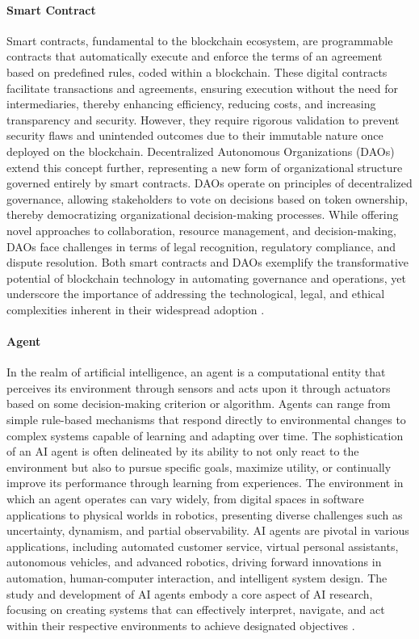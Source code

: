 \documentclass{article}
\begin{document}
\paragraph{Smart Contract}
Smart contracts, fundamental to the blockchain ecosystem, are programmable contracts that automatically execute and enforce the terms of an agreement based on predefined rules, coded within a blockchain. These digital contracts facilitate transactions and agreements, ensuring execution without the need for intermediaries, thereby enhancing efficiency, reducing costs, and increasing transparency and security. However, they require rigorous validation to prevent security flaws and unintended outcomes due to their immutable nature once deployed on the blockchain. Decentralized Autonomous Organizations (DAOs) extend this concept further, representing a new form of organizational structure governed entirely by smart contracts. DAOs operate on principles of decentralized governance, allowing stakeholders to vote on decisions based on token ownership, thereby democratizing organizational decision-making processes. While offering novel approaches to collaboration, resource management, and decision-making, DAOs face challenges in terms of legal recognition, regulatory compliance, and dispute resolution. Both smart contracts and DAOs exemplify the transformative potential of blockchain technology in automating governance and operations, yet underscore the importance of addressing the technological, legal, and ethical complexities inherent in their widespread adoption \cite{Szabo1997, Buterin2014DAO}.

\paragraph{Agent}
In the realm of artificial intelligence, an agent is a computational entity that perceives its environment through sensors and acts upon it through actuators based on some decision-making criterion or algorithm. Agents can range from simple rule-based mechanisms that respond directly to environmental changes to complex systems capable of learning and adapting over time. The sophistication of an AI agent is often delineated by its ability to not only react to the environment but also to pursue specific goals, maximize utility, or continually improve its performance through learning from experiences. The environment in which an agent operates can vary widely, from digital spaces in software applications to physical worlds in robotics, presenting diverse challenges such as uncertainty, dynamism, and partial observability. AI agents are pivotal in various applications, including automated customer service, virtual personal assistants, autonomous vehicles, and advanced robotics, driving forward innovations in automation, human-computer interaction, and intelligent system design. The study and development of AI agents embody a core aspect of AI research, focusing on creating systems that can effectively interpret, navigate, and act within their respective environments to achieve designated objectives \cite{RussellNorvig2020, Wooldridge2009}.
\end{document}
